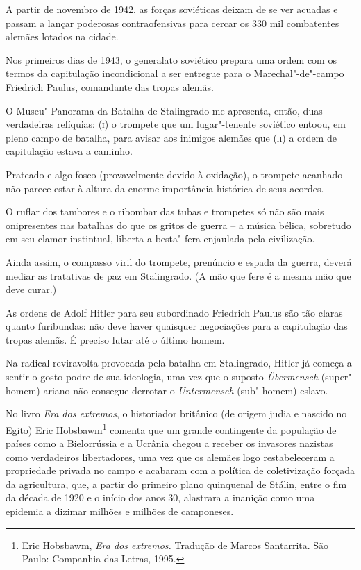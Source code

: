 A partir de novembro de 1942, as forças soviéticas deixam de se ver
acuadas e passam a lançar poderosas contraofensivas para cercar os 330
mil combatentes alemães lotados na cidade.

Nos primeiros dias de 1943, o generalato soviético prepara uma ordem com
os termos da capitulação incondicional a ser entregue para o
Marechal"-de"-campo Friedrich Paulus, comandante das tropas alemãs.

O Museu"-Panorama da Batalha de Stalingrado me apresenta, então, duas
verdadeiras relíquias: \textsc{(i)} o trompete que um lugar"-tenente
soviético entoou, em pleno campo de batalha, para avisar aos inimigos
alemães que \textsc{(ii)} a ordem de capitulação estava a caminho.

Prateado e algo fosco (provavelmente devido à oxidação), o trompete
acanhado não parece estar à altura da enorme importância histórica de
seus acordes.

O ruflar dos tambores e o ribombar das tubas e trompetes só não são mais
onipresentes nas batalhas do que os gritos de guerra -- a música bélica,
sobretudo em seu clamor instintual, liberta a besta"-fera enjaulada pela
civilização.

Ainda assim, o compasso viril do trompete, prenúncio e espada da guerra,
deverá mediar as tratativas de paz em Stalingrado. (A mão que fere é a
mesma mão que deve curar.)

As ordens de Adolf Hitler para seu subordinado Friedrich Paulus são tão
claras quanto furibundas: não deve haver quaisquer negociações para a
capitulação das tropas alemãs. É preciso lutar até o último homem.

Na radical reviravolta provocada pela batalha em Stalingrado, Hitler já
começa a sentir o gosto podre de sua ideologia, uma vez que o suposto
\emph{Übermensch} (super"-homem) ariano não consegue derrotar o
\emph{Untermensch} (sub"-homem) eslavo.

No livro \emph{Era dos extremos}, o historiador britânico (de origem
judia e nascido no Egito) Eric Hobsbawm\footnote{Eric Hobsbawm,
  \emph{Era dos extremos.} Tradução de Marcos Santarrita. São Paulo:
  Companhia das Letras, 1995.} comenta que um grande contingente da
população de países como a Bielorrússia e a Ucrânia chegou a receber os
invasores nazistas como verdadeiros libertadores, uma vez que os alemães
logo restabeleceram a propriedade privada no campo e acabaram com a
política de coletivização forçada da agricultura, que, a partir do
primeiro plano quinquenal de Stálin, entre o fim da década de 1920 e o
início dos anos 30, alastrara a inanição como uma epidemia a dizimar
milhões e milhões de camponeses.

